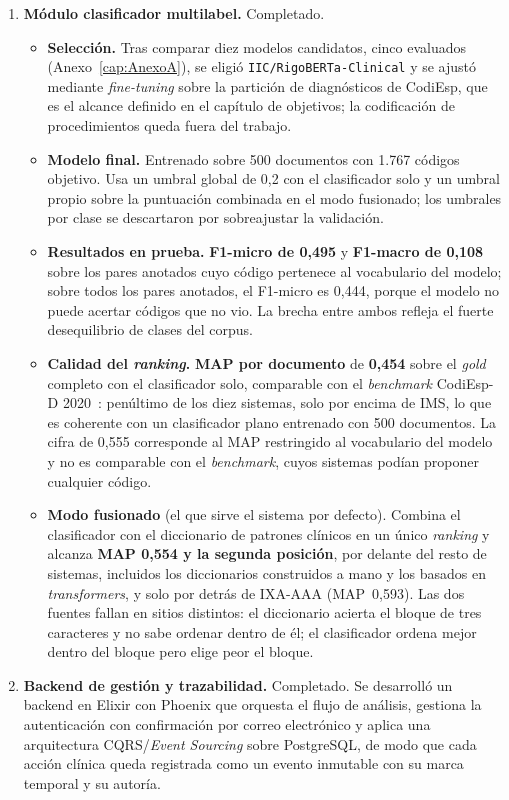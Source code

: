 \begin{enumerate}
 \item \textbf{Módulo clasificador multilabel.} Completado.
 \begin{itemize}
  \item \textbf{Selección.} Tras comparar diez modelos candidatos, cinco evaluados (Anexo~\ref{cap:AnexoA}), se eligió \texttt{IIC/RigoBERTa-Clinical} y se ajustó mediante \emph{fine-tuning} sobre la partición de diagnósticos de CodiEsp, que es el alcance definido en el capítulo de objetivos; la codificación de procedimientos queda fuera del trabajo.
  \item \textbf{Modelo final.} Entrenado sobre 500 documentos con 1.767 códigos objetivo. Usa un umbral global de 0,2 con el clasificador solo y un umbral propio sobre la puntuación combinada en el modo fusionado; los umbrales por clase se descartaron por sobreajustar la validación.
  \item \textbf{Resultados en prueba.} \textbf{F1-micro de 0,495} y \textbf{F1-macro de 0,108} sobre los pares anotados cuyo código pertenece al vocabulario del modelo; sobre todos los pares anotados, el F1-micro es 0,444, porque el modelo no puede acertar códigos que no vio. La brecha entre ambos refleja el fuerte desequilibrio de clases del corpus.
  \item \textbf{Calidad del \emph{ranking}.} \textbf{MAP por documento} de \textbf{0,454} sobre el \emph{gold} completo con el clasificador solo, comparable con el \emph{benchmark} CodiEsp-D 2020~\cite{miranda2020}: penúltimo de los diez sistemas, solo por encima de IMS, lo que es coherente con un clasificador plano entrenado con 500 documentos. La cifra de 0,555 corresponde al MAP restringido al vocabulario del modelo y no es comparable con el \emph{benchmark}, cuyos sistemas podían proponer cualquier código.
  \item \textbf{Modo fusionado} (el que sirve el sistema por defecto). Combina el clasificador con el diccionario de patrones clínicos en un único \emph{ranking} y alcanza \textbf{MAP 0,554 y la segunda posición}, por delante del resto de sistemas, incluidos los diccionarios construidos a mano y los basados en \emph{transformers}, y solo por detrás de IXA-AAA (MAP~0,593). Las dos fuentes fallan en sitios distintos: el diccionario acierta el bloque de tres caracteres y no sabe ordenar dentro de él; el clasificador ordena mejor dentro del bloque pero elige peor el bloque.
 \end{itemize}

 \item \textbf{Backend de gestión y trazabilidad.} Completado. Se desarrolló un backend en Elixir con Phoenix que orquesta el flujo de análisis, gestiona la autenticación con confirmación por correo electrónico y aplica una arquitectura CQRS/\emph{Event Sourcing} sobre PostgreSQL, de modo que cada acción clínica queda registrada como un evento inmutable con su marca temporal y su autoría.


\end{enumerate}
